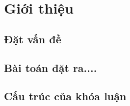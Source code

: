 \chapter{Giới thiệu} 

\section{Đặt vấn đề}




\section{Bài toán đặt ra....}




\section{Cấu trúc của khóa luận}


